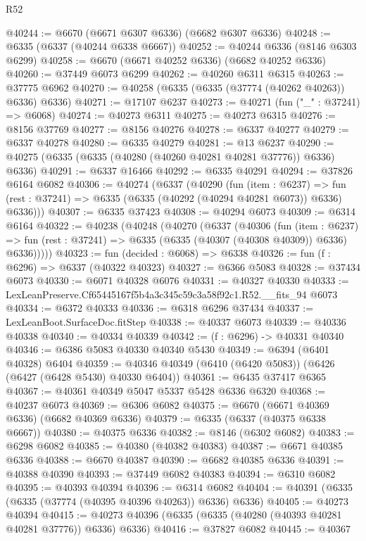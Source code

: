 \begin{lexlean}{R52}
\begin{coremodule}
@40244 := @6670 (@6671 @6307 @6336) (@6682 @6307 @6336)
@40248 := @6335 (@6337 (@40244 @6338 @6667))
@40252 := @40244 @6336 (@8146 @6303 @6299)
@40258 := @6670 (@6671 @40252 @6336) (@6682 @40252 @6336)
@40260 := @37449 @6073 @6299
@40262 := @40260 @6311 @6315
@40263 := @37775 @6962
@40270 := @40258 (@6335 (@6335 (@37774 (@40262 @40263)) @6336) @6336)
@40271 := @17107 @6237
@40273 := @40271 (fun ("_" : @37241) => @6068)
@40274 := @40273 @6311
@40275 := @40273 @6315
@40276 := @8156 @37769
@40277 := @8156 @40276
@40278 := @6337 @40277
@40279 := @6337 @40278
@40280 := @6335 @40279
@40281 := @13 @6237
@40290 := @40275 (@6335 (@6335 (@40280 (@40260 @40281 @40281 @37776)) @6336) @6336)
@40291 := @6337 @16466
@40292 := @6335 @40291
@40294 := @37826 @6164 @6082
@40306 := @40274
    (@6337
      (@40290
        (fun (item : @6237) =>
        fun (rest : @37241) => @6335 (@6335 (@40292 (@40294 @40281 @6073)) @6336) @6336)))
@40307 := @6335 @37423
@40308 := @40294 @6073
@40309 := @6314 @6164
@40322 := @40238
    (@40248
      (@40270
        (@6337
          (@40306
            (fun (item : @6237) =>
            fun (rest : @37241) => @6335 (@6335 (@40307 (@40308 @40309)) @6336) @6336)))))
@40323 := fun (decided : @6068) => @6338
@40326 := fun (f : @6296) => @6337 (@40322 @40323)
@40327 := @6366 @5083
@40328 := @37434 @6073
@40330 := @6071 @40328 @6076
@40331 := @40327 @40330
@40333 := LexLeanPreserve.Cf65445167f5b4a3c345c59c3a58f92c1.R52.__fits_94 @6073
@40334 := @6372 @40333
@40336 := @6318 @6296 @37434
@40337 := LexLeanBoot.SurfaceDoc.fitStep
@40338 := @40337 @6073
@40339 := @40336 @40338
@40340 := @40334 @40339
@40342 := (f : @6296) -> @40331 @40340
@40346 := @6386 @5083 @40330 @40340 @5430
@40349 := @6394 (@6401 @40328) @6404
@40359 := @40346 @40349 (@6410 (@6420 @5083)) (@6426 (@6427 (@6428 @5430) @40330 @6404))
@40361 := @6435 @37417 @6365
@40367 := @40361 @40349 @5047 @5337 @5428 @6336 @6320
@40368 := @40237 @6073
@40369 := @6306 @6082
@40375 := @6670 (@6671 @40369 @6336) (@6682 @40369 @6336)
@40379 := @6335 (@6337 (@40375 @6338 @6667))
@40380 := @40375 @6336
@40382 := @8146 (@6302 @6082)
@40383 := @6298 @6082
@40385 := @40380 (@40382 @40383)
@40387 := @6671 @40385 @6336
@40388 := @6670 @40387
@40390 := @6682 @40385 @6336
@40391 := @40388 @40390
@40393 := @37449 @6082 @40383
@40394 := @6310 @6082
@40395 := @40393 @40394
@40396 := @6314 @6082
@40404 := @40391 (@6335 (@6335 (@37774 (@40395 @40396 @40263)) @6336) @6336)
@40405 := @40273 @40394
@40415 := @40273 @40396 (@6335 (@6335 (@40280 (@40393 @40281 @40281 @37776)) @6336) @6336)
@40416 := @37827 @6082
@40445 := @40367

\end{coremodule}
\end{lexlean}

